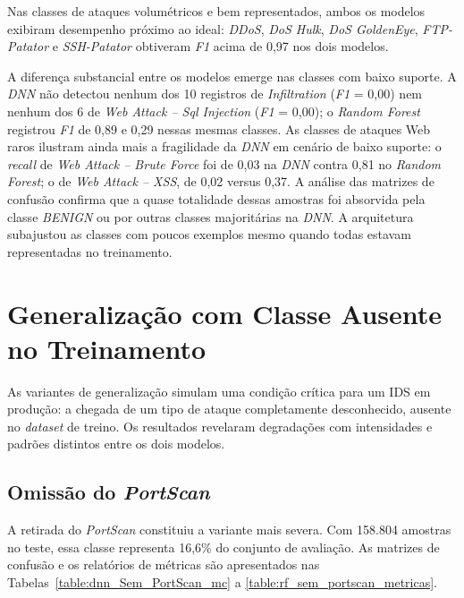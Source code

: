 

Nas classes de ataques volumétricos e bem representados, ambos os modelos exibiram desempenho próximo ao ideal: \textit{DDoS}, \textit{DoS Hulk}, \textit{DoS GoldenEye}, \textit{FTP-Patator} e \textit{SSH-Patator} obtiveram \textit{F1} acima de 0,97 nos dois modelos.

A diferença substancial entre os modelos emerge nas classes com baixo suporte. A \textit{DNN} não detectou nenhum dos 10 registros de \textit{Infiltration} (\textit{F1} = 0,00) nem nenhum dos 6 de \textit{Web Attack -- Sql Injection} (\textit{F1} = 0,00); o \textit{Random Forest} registrou \textit{F1} de 0,89 e 0,29 nessas mesmas classes. As classes de ataques Web raros ilustram ainda mais a fragilidade da \textit{DNN} em cenário de baixo suporte: o \textit{recall} de \textit{Web Attack -- Brute Force} foi de 0,03 na \textit{DNN} contra 0,81 no \textit{Random Forest}; o de \textit{Web Attack -- XSS}, de 0,02 versus 0,37. A análise das matrizes de confusão confirma que a quase totalidade dessas amostras foi absorvida pela classe \textit{BENIGN} ou por outras classes majoritárias na \textit{DNN}. A arquitetura subajustou as classes com poucos exemplos mesmo quando todas estavam representadas no treinamento.

\section{Generalização com Classe Ausente no Treinamento}

As variantes de generalização simulam uma condição crítica para um IDS em produção: a chegada de um tipo de ataque completamente desconhecido, ausente no \textit{dataset} de treino. Os resultados revelaram degradações com intensidades e padrões distintos entre os dois modelos.

\subsection{Omissão do \textit{PortScan}}

A retirada do \textit{PortScan} constituiu a variante mais severa. Com 158.804 amostras no teste, essa classe representa 16,6\% do conjunto de avaliação. As matrizes de confusão e os relatórios de métricas são apresentados nas Tabelas~\ref{table:dnn_Sem_PortScan_mc} a \ref{table:rf_sem_portscan_metricas}.

